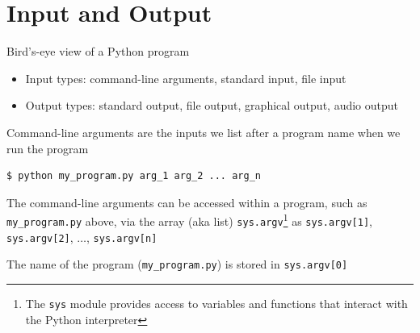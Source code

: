 \documentclass[8pt,a4paper,compress]{beamer}
\begin{document}
\section{Input and Output}
\begin{frame}[fragile]
\pause

Bird's-eye view of a Python program
\begin{center}
\end{center}
\begin{itemize}
\item Input types: command-line arguments, standard input, file input
\item Output types: standard output, file output, graphical output, audio output
\end{itemize}
\end{frame}

\begin{frame}[fragile]
\pause

Command-line arguments are the inputs we list after a program name when we run the program

\begin{lstlisting}[language={}]
$ python my_program.py arg_1 arg_2 ... arg_n
\end{lstlisting}

\pause
\bigskip

The command-line arguments can be accessed within a program, such as \lstinline{my_program.py} above, via the array (aka list) \lstinline{sys.argv}\footnote{The \lstinline{sys} module provides access to variables and functions that interact with the Python interpreter}  as \lstinline{sys.argv[1]}, \lstinline{sys.argv[2]}, $\dots$, \lstinline{sys.argv[n]}

\pause
\bigskip

The name of the program (\lstinline{my_program.py}) is stored in \lstinline{sys.argv[0]} 
\end{frame}
\end{document}
